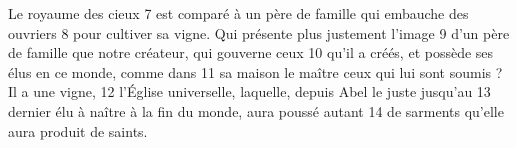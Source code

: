 Le royaume des cieux	 
7	 	est comparé à un père de famille qui embauche des ouvriers	 
8	 	pour cultiver sa vigne. Qui présente plus justement l'image	 
9	 	d'un père de famille que notre créateur, qui gouverne ceux	 
10	 	qu'il a créés, et possède ses élus en ce monde, comme dans	 
11	 	sa maison le maître ceux qui lui sont soumis ? Il a une vigne,	 
12	 	l'Église universelle, laquelle, depuis Abel le juste jusqu'au	 
13	 	dernier élu à naître à la fin du monde, aura poussé autant	 
14	 	de sarments qu'elle aura produit de saints.